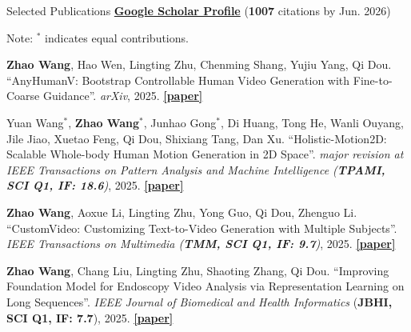 \documentclass[a4paper]{resume} %
\begin{document}
\begin{rSection}{Selected Publications}
\href{https://scholar.google.com/citations?user=1kEufdwAAAAJ}{\bf Google Scholar Profile} ({\bf 1007} citations by Jun. 2026)
\vspace{-0.3em}

Note: {\bf $^*$} indicates equal contributions.

\begin{enumerate}[label={[\arabic*]}, topsep=0em, leftmargin=1.4em, itemsep=-0.5em]

\item {\bf Zhao Wang}, Hao Wen, Lingting Zhu, Chenming Shang, Yujiu Yang, Qi Dou. “AnyHumanV: Bootstrap Controllable Human Video Generation with Fine-to-Coarse Guidance”. {\it arXiv}, 2025. \href{https://www.arxiv.org/abs/2502.08189}{\bf [paper]}

\item Yuan Wang$^*$, {\bf Zhao Wang}$^*$, Junhao Gong$^*$, Di Huang, Tong He, Wanli Ouyang, Jile Jiao, Xuetao Feng, Qi Dou, Shixiang Tang, Dan Xu. “Holistic-Motion2D: Scalable Whole-body Human Motion Generation in 2D Space”. {\it major revision at IEEE Transactions on Pattern Analysis and Machine Intelligence ({\bf TPAMI, SCI Q1, IF: 18.6})}, 2025. \href{https://arxiv.org/abs/2406.11253}{\bf [paper]}

\item {\bf Zhao Wang}, Aoxue Li, Lingting Zhu, Yong Guo, Qi Dou, Zhenguo Li. “CustomVideo: Customizing Text-to-Video Generation with Multiple Subjects”. {\it IEEE Transactions on Multimedia ({\bf TMM, SCI Q1, IF: 9.7})}, 2025. \href{https://arxiv.org/abs/2401.09962}{\bf [paper]}


\item {\bf Zhao Wang}, Chang Liu, Lingting Zhu, Shaoting Zhang, Qi Dou. “Improving Foundation Model for Endoscopy Video Analysis via Representation Learning on Long Sequences”. {\it IEEE Journal of Biomedical and Health Informatics} ({\bf JBHI, SCI Q1, IF: 7.7}), 2025. \href{https://ieeexplore.ieee.org/abstract/document/10885043}{\bf [paper]}


\end{enumerate}
\end{rSection}
\end{document}
